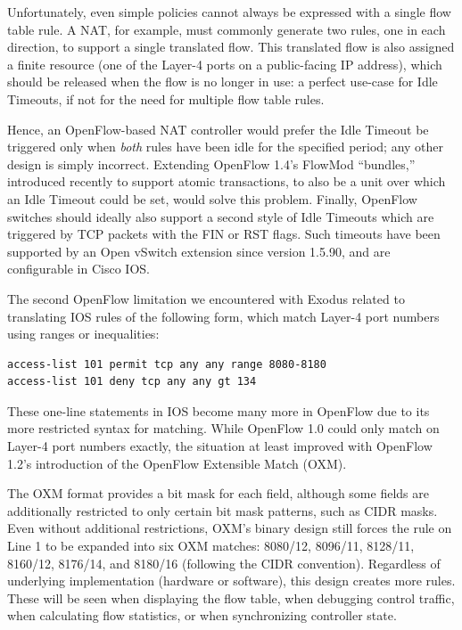 Unfortunately, even simple policies cannot always be expressed with a single
flow table rule. A NAT, for example, must commonly generate two rules, one in
each direction, to support a single translated flow. This translated
flow is also
assigned a finite resource (one of the Layer-4 ports on a public-facing IP address),
which should be released when the flow is no longer in use: a perfect use-case
for Idle Timeouts, if not for the need for multiple flow table rules.

Hence, an OpenFlow-based NAT controller would prefer the Idle Timeout be
triggered only when \emph{both} rules have been idle for the specified period;
any other design is simply incorrect. Extending OpenFlow 1.4's FlowMod ``bundles,''
introduced recently to support atomic transactions, to also be a unit over which
an Idle Timeout could be set, would solve this problem.
Finally, OpenFlow switches should ideally also support a second style of Idle
Timeouts which are triggered by TCP packets with the FIN or RST flags.
Such timeouts have been supported by an Open vSwitch extension since
version 1.5.90, and are configurable in Cisco IOS.


The second OpenFlow limitation we encountered with Exodus related to
translating IOS rules of the following form, which match Layer-4 port numbers
using ranges or inequalities:

\begin{lstlisting}[label=lst:filter-example,language=IOS]
access-list 101 permit tcp any any range 8080-8180
access-list 101 deny tcp any any gt 134
\end{lstlisting}

These one-line statements in IOS become many more in OpenFlow due to
its more restricted syntax for matching. While OpenFlow 1.0 could
only match on Layer-4 port numbers exactly, the situation at least improved
with OpenFlow 1.2's introduction of the OpenFlow Extensible Match (OXM).

The OXM format provides a bit mask for each field, although some fields are
additionally restricted to only certain bit mask patterns, such as CIDR masks.
Even without additional restrictions, OXM's binary design still forces the rule
on Line 1 to be expanded into six OXM matches: 8080/12, 8096/11, 8128/11,
8160/12, 8176/14, and 8180/16 (following the CIDR convention). 
Regardless of underlying implementation (hardware or software), this design creates
more rules. These will be seen when displaying the flow table, when debugging
control traffic, when calculating flow statistics, or when synchronizing controller state.

